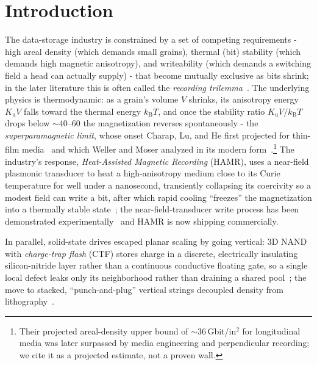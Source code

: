\documentclass[11pt]{article}
\theoremstyle{definition}
\begin{document}
\section{Introduction}
\label{sec:intro}

The data-storage industry is constrained by a set of competing requirements - high areal
density (which demands small grains), thermal (bit) stability (which demands high magnetic
anisotropy), and writeability (which demands a switching field a head can actually
supply) - that become mutually exclusive as bits shrink; in the later literature this is
often called the \emph{recording trilemma}~\cite{wellermoser1999}. The underlying physics
is thermodynamic: as a grain's volume $V$ shrinks, its anisotropy energy $K_{\mathrm{u}}V$
falls toward the thermal energy $k_{\mathrm{B}}T$, and once the stability ratio
$K_{\mathrm{u}}V/k_{\mathrm{B}}T$ drops below ${\sim}40$--$60$ the magnetization reverses
spontaneously - the \emph{superparamagnetic limit}, whose onset Charap, Lu, and He first
projected for thin-film media~\cite{charap1997} and which Weller and Moser analyzed in its
modern form~\cite{wellermoser1999}.\footnote{Their projected areal-density upper bound of
${\sim}36$\,Gbit/in$^2$ for longitudinal media was later surpassed by media engineering and
perpendicular recording; we cite it as a projected estimate, not a proven wall.}
The industry's response, \emph{Heat-Assisted Magnetic Recording} (HAMR), uses a near-field
plasmonic transducer to heat a high-anisotropy medium close to its Curie temperature for
well under a nanosecond, transiently collapsing its coercivity so a modest field can write
a bit, after which rapid cooling ``freezes'' the magnetization into a thermally stable
state~\cite{kryder2008hamr}; the near-field-transducer write process has been demonstrated
experimentally~\cite{challener2009} and HAMR is now shipping commercially.

In parallel, solid-state drives escaped planar scaling by going vertical: 3D NAND with
\emph{charge-trap flash} (CTF) stores charge in a discrete, electrically insulating
silicon-nitride layer rather than a continuous conductive floating gate, so a single local
defect leaks only its neighborhood rather than draining a shared
pool~\cite{white2000sonos}; the move to stacked, ``punch-and-plug'' vertical strings
decoupled density from lithography~\cite{tanaka2007bics,goda2020}.
\end{document}
